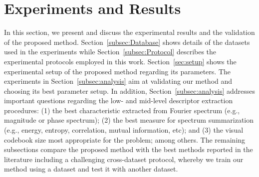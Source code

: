 \section{Experiments and Results}\label{sec:experimentalresults}
In this section, we present and discuss the experimental results and the validation of the proposed method. Section~\ref{subsec:Database} shows details of the datasets used in the experiments while Section~\ref{subsec:Protocol} describes the experimental protocols employed in this work. Section~\ref{sec:setup} shows the experimental setup of the proposed method regarding its parameters. The experiments in Section~\ref{subsec:analysis} aim at validating our method and choosing its best parameter setup. In addition, Section~\ref{subsec:analysis} addresses important questions regarding the low- and mid-level descriptor extraction procedures: {(1) the best characteristic extracted from Fourier spectrum (e.g., magnitude or phase spectrum); (2) the best measure for spectrum summarization (e.g., energy, entropy, correlation, mutual information, etc);} and (3) the visual codebook size most appropriate for the problem; among others. The remaining subsections compare the proposed method with the best methods reported in the literature including a challenging cross-dataset protocol, whereby we train our method using a dataset and test it with another dataset.

